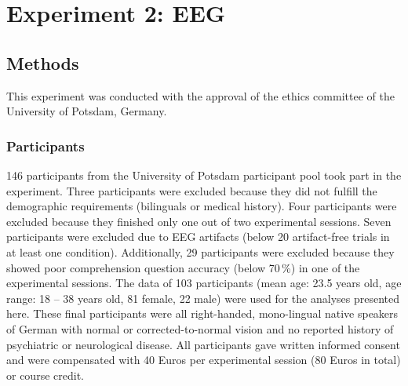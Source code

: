 \documentclass[a4paper, man, floatsintext]{apa7}
\begin{document}




\clearpage
\section{Experiment 2: EEG}
\subsection{Methods}
This experiment was conducted with the approval of the ethics committee of the University of Potsdam, Germany.

\subsubsection{Participants}
146 participants from the University of Potsdam participant pool took part in the experiment. Three participants were excluded because they did not fulfill the demographic requirements (bilinguals or medical history). Four participants were excluded because they finished only one out of two experimental sessions. Seven participants were excluded due to EEG artifacts (below 20 artifact-free trials in at least one condition). Additionally, 29 participants were excluded because they showed poor comprehension question accuracy (below 70\,\%) in one of the experimental sessions. The data of 103 participants (mean age: 23.5 years old, age range: 18 -- 38 years old, 81 female, 22 male) were used for the analyses presented here. These final participants were all right-handed, mono-lingual native speakers of German with normal or corrected-to-normal vision and no reported history of psychiatric or neurological disease. All participants gave written informed consent and were compensated with 40 Euros per experimental session (80 Euros in total) or course credit.
\end{document}

